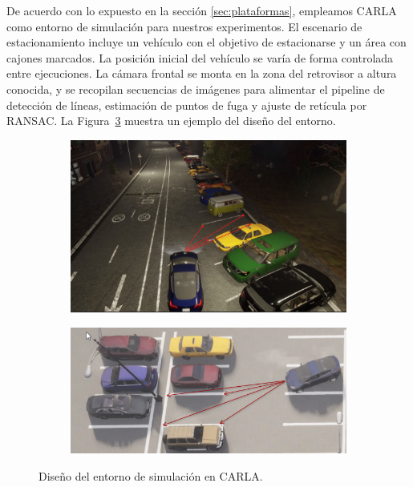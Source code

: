 
De acuerdo con lo expuesto en la sección \ref{sec:plataformas},
empleamos CARLA como entorno de simulación para nuestros experimentos.
El escenario de estacionamiento incluye un vehículo con el objetivo de estacionarse y un área con cajones marcados.
La posición inicial del vehículo se varía de forma controlada entre ejecuciones.
La cámara frontal se monta en la zona del retrovisor a altura conocida,
y se recopilan secuencias de imágenes para alimentar el pipeline de detección de líneas,
estimación de puntos de fuga y ajuste de retícula por RANSAC.
La Figura~\ref{fig:simulation-design} muestra un ejemplo del diseño del entorno.

\begin{figure}[!ht]
    \centering
    \begin{subfigure}{0.4\textwidth}
        \includegraphics[width=\textwidth]{img/distances}\label {fig:distances}
    \end{subfigure}
    \begin{subfigure}{0.4\textwidth}
        \includegraphics[width=\textwidth]{img/distances2}\label {fig:distances2}
    \end{subfigure}

    \caption{Diseño del entorno de simulación en CARLA.}
    \label{fig:simulation-design}
\end{figure}


